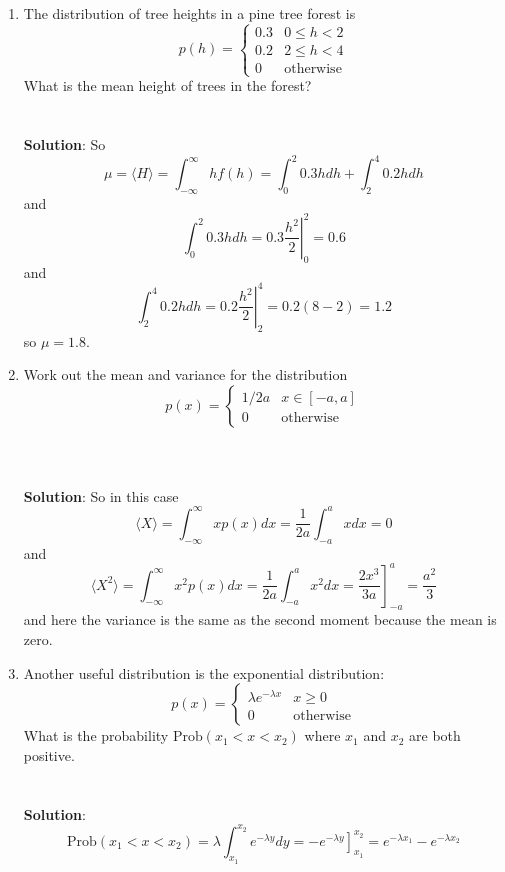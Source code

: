 \documentclass[11pt,a4paper]{scrartcl}
\begin{document}
\begin{enumerate}
\item The distribution of tree heights in a pine tree forest is 
\begin{equation}
p(h)=\left\{\begin{array}{cc}0.3& 0\le h <2\\0.2& 2\le h<4\\0&\mbox{otherwise}\end{array}\right.
\end{equation}
What is the mean height of trees in the forest?
\\ \\ \\
\textbf{Solution}: So 
\begin{equation}
\mu =\langle H\rangle=\int_{-\infty}^\infty hf(h)=\int_{0}^2 {0.3h}dh+\int_2^4{0.2h}dh
\end{equation}
and
\begin{equation}
\int_{0}^2 {0.3h}dh=\left.0.3\frac{h^2}{2}\right|_0^2=0.6
\end{equation}
and
\begin{equation}
\int_{2}^4 {0.2h}dh=\left.0.2\frac{h^2}{2}\right|_2^4=0.2 (8-2)=1.2
\end{equation}
so $\mu=1.8$.

\item Work out the mean and variance for the distribution
  \begin{equation}
    p(x)=\left\{\begin{array}{ll}1/2a&x\in [-a,a]\\0&\mbox{otherwise}\end{array}\right.
  \end{equation}
\\ \\ \\
\textbf{Solution}: So in this case
\begin{equation}
  \langle X\rangle =\int_{-\infty}^\infty xp(x)dx=\frac{1}{2a}\int_{-a}^a xdx=0
\end{equation}
and
\begin{equation}
  \langle X^2\rangle =\int_{-\infty}^\infty x^2p(x)dx=\frac{1}{2a}\int_{-a}^a x^2dx=\left.\frac{2x^3}{3a}\right]_{-a}^a=\frac{a^2}{3}
\end{equation}
and here the variance is the same as the second moment because the mean is zero.
  
\item Another useful distribution is the exponential distribution:
$$
p(x)=\left\{\begin{array}{cc}\lambda e^{-\lambda x}& x\ge 0\\ 0&\mbox{otherwise}\end{array}\right.
$$
What is the probability $\mbox{Prob}(x_1 < x <x_2)$ where $x_1$ and $x_2$ are both positive.
  \\ \\ \\ \textbf{Solution}: 
\begin{equation}
\mbox{Prob}(x_1 < x <x_2)=\lambda \int_{x_1}^{x_2} e^{-\lambda y}dy=-\left. e^{-\lambda y} \right]_{x_1}^{x_2}=e^{-\lambda x_1}-e^{-\lambda x_2}
\end{equation}


\end{enumerate}
\end{document}
